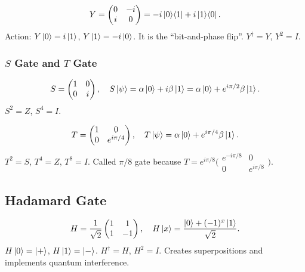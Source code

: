 \documentclass[10pt,a4paper]{article}
\begin{document}
\begin{tcolorbox}[defstyle, title={Definition: Pauli-$Y$ Gate}]
\[
Y = \begin{pmatrix}0&-i\\i&0\end{pmatrix} = -i\ket{0}\!\bra{1}+i\ket{1}\!\bra{0}.
\]
Action: $Y\ket{0}=i\ket{1}$, $Y\ket{1}=-i\ket{0}$. It is the ``bit-and-phase flip''. $Y^\dagger=Y$, $Y^2=I$.
\end{tcolorbox}

\subsubsection*{$S$ Gate and $T$ Gate}

\begin{tcolorbox}[defstyle, title={Definition: $S$ (Phase) Gate}]
\[
S = \begin{pmatrix}1&0\\0&i\end{pmatrix},\quad S\ket{\psi}=\alpha\ket{0}+i\beta\ket{1}=\alpha\ket{0}+e^{i\pi/2}\beta\ket{1}.
\]
$S^2=Z$, $S^4=I$.
\end{tcolorbox}

\begin{tcolorbox}[defstyle, title={Definition: $T$ ($\pi/8$) Gate}]
\[
T = \begin{pmatrix}1&0\\0&e^{i\pi/4}\end{pmatrix},\quad T\ket{\psi}=\alpha\ket{0}+e^{i\pi/4}\beta\ket{1}.
\]
$T^2=S$, $T^4=Z$, $T^8=I$. Called $\pi/8$ gate because $T=e^{i\pi/8}\bigl(\begin{smallmatrix}e^{-i\pi/8}&0\\0&e^{i\pi/8}\end{smallmatrix}\bigr)$.
\end{tcolorbox}

\subsection{Hadamard Gate}

\begin{tcolorbox}[defstyle, title={Definition: Hadamard Gate}]
\[
H = \frac{1}{\sqrt{2}}\begin{pmatrix}1&1\\1&-1\end{pmatrix},\quad H\ket{x}=\frac{\ket{0}+(-1)^x\ket{1}}{\sqrt{2}}.
\]
$H\ket{0}=\ket{+}$, $H\ket{1}=\ket{-}$. $H^\dagger=H$, $H^2=I$. Creates superpositions and implements quantum interference.
\end{tcolorbox}
\end{document}
